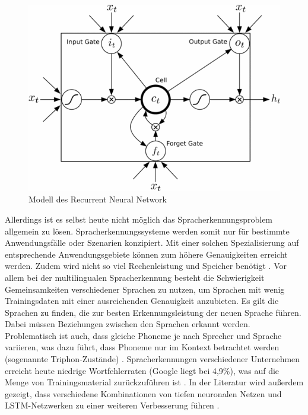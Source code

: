 \begin{figure}[h!]
	\centering
	\includegraphics[width=0.9\linewidth]{images/lstm_cell}
	\caption{Modell des Recurrent Neural Network \cite{deeplearning4j}} %
	\label{fig:topology}
\end{figure}  

Allerdings ist es selbst heute nicht möglich das Spracherkennungsproblem allgemein zu lösen. Spracherkennungssysteme werden somit nur für bestimmte Anwendungsfälle oder Szenarien konzipiert. Mit einer solchen Spezialisierung auf entsprechende Anwendungsgebiete können zum höhere Genauigkeiten erreicht werden. Zudem wird nicht so viel Rechenleistung und Speicher benötigt {\cite{beat_tobias}}. Vor allem bei der multilingualen Spracherkennung besteht die Schwierigkeit Gemeinsamkeiten verschiedener Sprachen zu nutzen, um Sprachen mit wenig Trainingsdaten mit einer ausreichenden Genauigkeit anzubieten. Es gilt die Sprachen zu finden, die zur besten Erkennungsleistung der neuen Sprache führen. Dabei müssen Beziehungen zwischen den Sprachen erkannt werden. Problematisch ist auch, dass gleiche Phoneme je nach Sprecher und Sprache variieren, was dazu führt, dass Phoneme nur im Kontext betrachtet werden (sogenannte Triphon-Zustände) {\cite{Yu.2014}}. Spracherkennungen verschiedener Unternehmen erreicht heute niedrige Wortfehlerraten (Google liegt bei 4,9\%), was auf die Menge von Trainingsmaterial zurückzuführen ist {\cite{venturebeat}} {\cite{9to5google}} {\cite{businessinsider}}. In der Literatur wird außerdem gezeigt, dass verschiedene Kombinationen von tiefen neuronalen Netzen und LSTM-Netzwerken zu einer weiteren Verbesserung führen {\cite{6638947}}. 